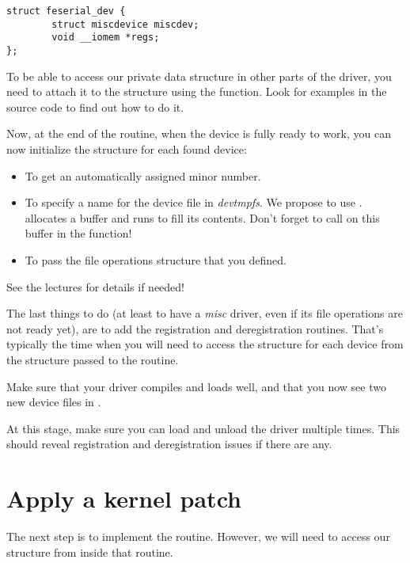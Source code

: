 \begin{verbatim}
struct feserial_dev {
        struct miscdevice miscdev;
        void __iomem *regs;
};
\end{verbatim}

To be able to access our private data structure in other parts of the
driver, you need to attach it to the  structure using the
 function. Look for examples in the
source code to find out how to do it.

Now, at the end of the  routine, when the device is fully ready
to work, you can now initialize the  structure
for each found device:

\begin{itemize}
\item To get an automatically assigned minor number.
\item To specify a name for the device file in {\em devtmpfs}. We
      propose to use
      .
       allocates a buffer and runs 
      to fill its contents.
      Don't forget to call  on this buffer in
      the  function!
\item To pass the file operations structure that you defined.
\end{itemize}

See the lectures for details if needed!

The last things to do (at least to have a {\em misc} driver, even if 
its file operations are not ready yet), are to add the registration and
deregistration routines. That's typically the time when you will need
to access the  structure for each device from the
 structure passed to the  routine.

Make sure that your driver compiles and loads well, and that you
now see two new device files in .

At this stage, make sure you can load and unload the driver multiple
times. This should reveal registration and deregistration issues if
there are any.

\section{Apply a kernel patch}

The next step is to implement the  routine. However, we
will need to access our  structure from inside that
routine. 

